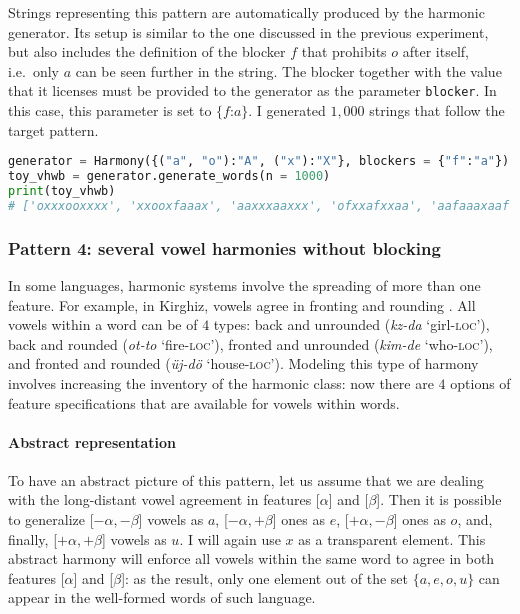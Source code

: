 Strings representing this pattern are automatically produced by the harmonic generator.
Its setup is similar to the one discussed in the previous experiment, but also includes the definition of the blocker $f$ that prohibits $o$ after itself, i.e.\ only $a$ can be seen further in the string.
The blocker together with the value that it licenses must be provided to the generator as the parameter \texttt{blocker}.
In this case, this parameter is set to $\{f$:$a\}$.
I generated $1,000$ strings that follow the target pattern.

\begin{lstlisting}[language=Python]
generator = Harmony({("a", "o"):"A", ("x"):"X"}, blockers = {"f":"a"})
toy_vhwb = generator.generate_words(n = 1000)
print(toy_vhwb)
# ['oxxxooxxxx', 'xxooxfaaax', 'aaxxxaaxxx', 'ofxxafxxaa', 'aafaaaxaaf', ...]
\end{lstlisting}


\subsubsection{Pattern 4: several vowel harmonies without blocking}

In some languages, harmonic systems involve the spreading of more than one feature.
For example, in Kirghiz, vowels agree in fronting and rounding \citep{Nanaev1950,Kaun95}.
All vowels within a word can be of $4$ types: back and unrounded (\emph{k\textbari z-da} `girl-\textsc{loc}'), back and rounded (\emph{ot-to} `fire-\textsc{loc}'), fronted and unrounded (\emph{kim-de} `who-\textsc{loc}'), and fronted and rounded (\emph{\"{u}j-d\"{o}} `house-\textsc{loc}').
Modeling this type of harmony involves increasing the inventory of the harmonic class: now there are $4$ options of feature specifications that are available for vowels within words.

\paragraph{Abstract representation}

To have an abstract picture of this pattern, let us assume that we are dealing with the long-distant vowel agreement in features {[}$\alpha${]} and {[}$\beta${]}.
Then it is possible to generalize {[}$-\alpha, -\beta${]} vowels as $a$, {[}$-\alpha, +\beta${]} ones as $e$, {[}$+\alpha, -\beta${]} ones as $o$, and, finally, {[}$+\alpha, +\beta${]} vowels as $u$.
I will again use $x$ as a transparent element.
This abstract harmony will enforce all vowels within the same word to agree in both features {[}$\alpha${]} and {[}$\beta${]}: as the result, only one element out of the set $\{a, e, o, u\}$ can appear in the well-formed words of such language.

